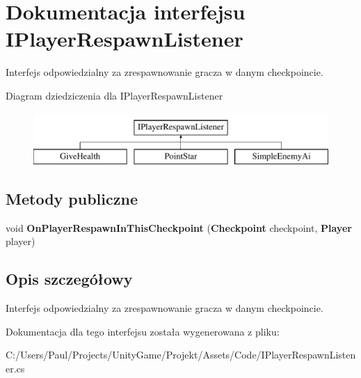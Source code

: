 \section{Dokumentacja interfejsu I\+Player\+Respawn\+Listener}
\label{interface_i_player_respawn_listener}


Interfejs odpowiedzialny za zrespawnowanie gracza w danym checkpoincie.  


Diagram dziedziczenia dla I\+Player\+Respawn\+Listener\begin{figure}[H]
\begin{center}
\leavevmode
\includegraphics[height=2.000000cm]{interface_i_player_respawn_listener}
\end{center}
\end{figure}
\subsection*{Metody publiczne}
\begin{DoxyCompactItemize}
\item 
void {\bfseries On\+Player\+Respawn\+In\+This\+Checkpoint} ({\bf Checkpoint} checkpoint, {\bf Player} player)\label{interface_i_player_respawn_listener_a3b16a7bd96d7d13af5efcb1cd403d44f}

\end{DoxyCompactItemize}


\subsection{Opis szczegółowy}
Interfejs odpowiedzialny za zrespawnowanie gracza w danym checkpoincie. 



Dokumentacja dla tego interfejsu została wygenerowana z pliku\+:\begin{DoxyCompactItemize}
\item 
C\+:/\+Users/\+Paul/\+Projects/\+Unity\+Game/\+Projekt/\+Assets/\+Code/I\+Player\+Respawn\+Listener.\+cs\end{DoxyCompactItemize}
